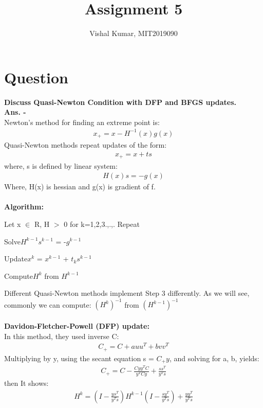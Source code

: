\documentclass[fleqn]{article}
\title{Assignment 5}
\author{Vishal Kumar, MIT2019090}
\date{}
\begin{document}
\maketitle
\section*{Question}
{\bf Discuss Quasi-Newton Condition with DFP and BFGS updates.}
\\
{\bf Ans. -}
\\
Newton’s method for finding an extreme point is:
\begin{align*}
x_{+} = x - H^{-1}(x)g(x)
\end{align*}
Quasi-Newton methods repeat updates of the form:
\begin{align*}
x_{+} = x + ts
\end{align*}
where, s is defined by linear system:
\begin{align*}
H(x)s = -g(x)
\end{align*}
Where, H(x) is hessian and g(x) is gradient of f.
\\
\\
{\bf Algorithm:}
\begin{algorithmic}
\State Let \quad x $\in$ R, H $>$ 0 for k=1,2,3.,.,. 
\State Repeat

\State \quad Solve\quad $H^{k-1}s^{k-1}$ = -$g^{k-1}$

\State \quad Update\quad $x^{k}$ = $x^{k-1}$ + $t_{k}s^{k-1}$

\State \quad Compute\quad $H^{k}$ from $H^{k-1}$
\end{algorithmic}
Different Quasi-Newton methods implement Step 3 differently. As
we will see, commonly we can compute:
$(H^{k})^{-1}$ from $(H^{k-1})^{-1}$
\\
\\
{\bf Davidon-Fletcher-Powell (DFP) update:}
\\
In this method, they used inverse C:
\begin{align*}
C_{+} = C + auu^{T} + bvv^{T}
\end{align*}
Multiplying by y, using the secant equation s = $C_{+}y$, and solving for a, b, yields:
\begin{align*}
C_{+} = C - \frac{Cyy^{T}C}{y^{T}Cy} + \frac{ss^{T}}{y^{T}s}
\end{align*}
then It shows:
\begin{align*}
H^{k} = (I - \frac{ys^{T}}{y^{T}s}) H^{k-1} (I - \frac{sy^{T}}{y^{T}s}) + \frac{yy^{T}}{y^{T}s}
\end{align*}
\end{document}
